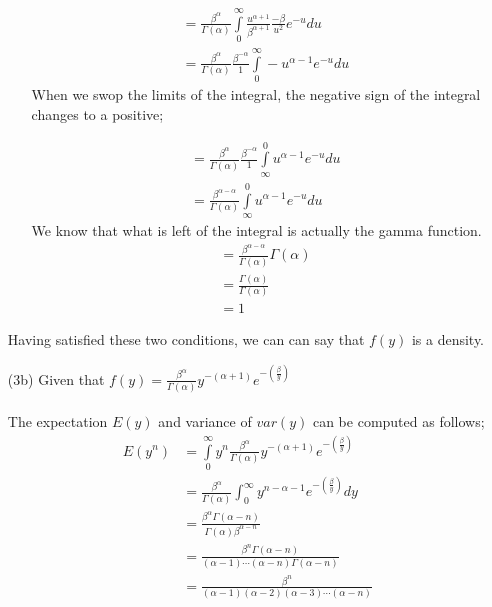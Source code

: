 \documentclass[12pt,a4paper]{article}
\begin{document}
\begin{itemize}
\begin{itemize}
\begin{align*}
&=\frac{\beta ^{\alpha}}{\Gamma \left(\alpha\right)}\int\limits_0^\infty \frac{u^{\alpha +1}}{\beta ^{\alpha+1}} \frac{-\beta}{u^{2}}e^{-u}du\\
&=\frac{\beta ^{\alpha}}{\Gamma \left(\alpha\right)} \frac{\beta^{-\alpha}}{1}\int\limits_0^\infty-u^{\alpha -1} e^{-u}du
\end{align*}
When we swop the limits of the integral, the negative sign of the integral changes to a positive;

\begin{align*}
&=\frac{\beta ^{\alpha}}{\Gamma \left(\alpha\right)} \frac{\beta^{-\alpha}}{1}\int\limits_\infty^0 u^{\alpha -1} e^{-u}du\\
&=\frac{\beta^{\alpha-\alpha}}{\Gamma \left(\alpha\right)}\int\limits_\infty^0 u^{\alpha -1} e^{-u}du
\end{align*}
We know that what is left of the integral is actually the gamma function.\\
\begin{align*}
&=\frac{\beta^{\alpha-\alpha}}{\Gamma \left(\alpha\right)} \Gamma \left(\alpha\right)\\
&=\frac{\Gamma \left(\alpha\right)}{\Gamma \left(\alpha\right)}\\
&=1
\end{align*}
\end{itemize}
Having satisfied these two conditions, we can can say that $f\left(y\right)$ is a density.
\newpage
\item[(3b)] Given that  
$f\left(y\right)=\frac{\beta^{\alpha}}{\Gamma \left(\alpha \right)} y^{-\left(\alpha+1\right)}e^{-\left(\frac{\beta}{y}\right)}$\\ 
\\
The expectation $E\left(y\right)$ and variance of $var\left(y\right)$ can be computed as follows;
\begin{align*}
E\left(y^{n}\right)&=\int\limits_{0}^{\infty}y^{n}\frac{\beta^{\alpha}}{\Gamma \left(\alpha \right)} y^{-\left(\alpha+1\right)}e^{-\left(\frac{\beta}{y}\right)}\\
&=\frac{\beta^\alpha}{\Gamma(\alpha)} \int_{0}^{\infty} y^{n-\alpha-1} e^{-\left(\frac{\beta}{y}\right)}dy\\ 
&=\frac{\beta^\alpha \Gamma(\alpha -n) }{\Gamma(\alpha)\beta^{\alpha - n}}\\
&= \frac{\beta^n \Gamma(\alpha -n) }{(\alpha -1) \cdots (\alpha - n) \Gamma(\alpha -n)}\\
&= \frac{\beta^n }{(\alpha -1)(\alpha -2)(\alpha -3) \cdots (\alpha - n)}

\end{align*}
\end{itemize}
\end{document}
